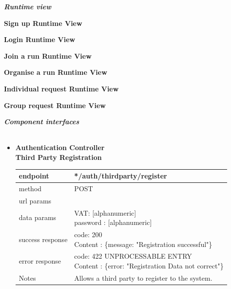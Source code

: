 \begin{legal}
		\item \textit{\textbf{Runtime view}}\\
			\begin{legal}
				\item \textbf{Sign up Runtime View}\\
				\item \textbf{Login Runtime View}\\
				\item \textbf{Join a run Runtime View}\\
				\item \textbf{Organise a run Runtime View}\\
				\item \textbf{Individual request Runtime View}\\
				\item \textbf{Group request Runtime View}\\
			\end {legal}
		\item \textit{\textbf{Component interfaces}}\\\\
			\begin{itemize}
				\item \textbf{Authentication Controller} \\
				
				\textbf{Third Party Registration} \\
			
					\begin{tabularx}{\linewidth}{| l | l |}
						\hline
						endpoint & */auth/thirdparty/register \\
						\hline
						method & POST \\
						\hline
						url params & \\
						\hline
						data params &
						\parbox{0.7\textwidth}{
							\bigskip
							VAT: [alphanumeric]\\
							password : [alphanumeric]\\
							\bigskip
						} \\
						\hline
						success response &
						\parbox{0.7\textwidth}{
							\bigskip
							code: 200\\
							Content : \{message: "Registration successful"\}
							\bigskip
						} \\
						\hline
						error response &
						\parbox{0.7\textwidth}{
							\bigskip
							code: 422 UNPROCESSABLE ENTRY \\
							Content : \{error: "Registration Data not correct"\}
							\bigskip
						} \\
						\hline
						Notes & 
						\parbox{0.7\textwidth}{
							\bigskip Allows a third party to register to the system.
						\bigskip}  \\
						\hline
					\end{tabularx}\\
					

\end{itemize}
\end{legal}
